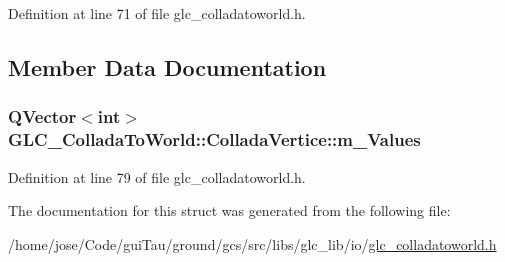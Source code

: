Definition at line 71 of file glc\-\_\-colladatoworld.\-h.



\subsection{Member Data Documentation}
\hypertarget{struct_g_l_c___collada_to_world_1_1_collada_vertice_ae5293261b625ab7b2fc776b7079849c0}{
\subsubsection[{m\-\_\-\-Values}]{\setlength{\rightskip}{0pt plus 5cm}Q\-Vector$<${\bf int}$>$ G\-L\-C\-\_\-\-Collada\-To\-World\-::\-Collada\-Vertice\-::m\-\_\-\-Values}}\label{struct_g_l_c___collada_to_world_1_1_collada_vertice_ae5293261b625ab7b2fc776b7079849c0}


Definition at line 79 of file glc\-\_\-colladatoworld.\-h.



The documentation for this struct was generated from the following file\-:\begin{DoxyCompactItemize}
\item 
/home/jose/\-Code/gui\-Tau/ground/gcs/src/libs/glc\-\_\-lib/io/\hyperlink{glc__colladatoworld_8h}{glc\-\_\-colladatoworld.\-h}\end{DoxyCompactItemize}

